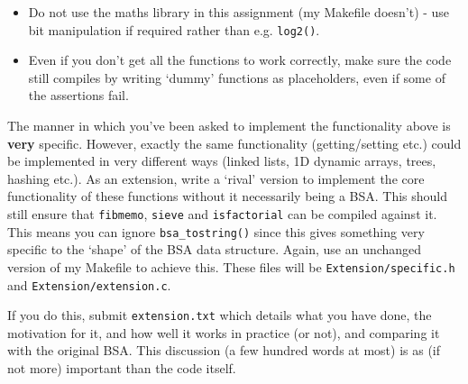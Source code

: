 \begin{exercise}
\begin{itemize}
\item Do not use the maths library in this assignment (my Makefile doesn't) -
use bit manipulation if required rather than e.g. \verb^log2()^.

\item Even if you don't get all the functions to work correctly, make
sure the code still compiles by writing `dummy' functions as placeholders,
even if some of the assertions fail.

\end{itemize}

\vspace*{1ex}

\noindent
The manner in which you've been asked to implement the functionality above is {\bf very}
specific. However, exactly the same functionality (getting/setting etc.) could be implemented
in very different ways (linked lists, 1D dynamic arrays, trees, hashing etc.).
As an extension, write a `rival' version to implement
the core functionality of these functions without it necessarily being a BSA.
This should still ensure that \verb^fibmemo^, \verb^sieve^ and
\verb^isfactorial^ can be compiled against it. This means you
can ignore \verb^bsa_tostring()^ since this gives something very
specific to the `shape' of the BSA data structure.  Again, use an
unchanged version of my Makefile to achieve this.  These files will be
\verb^Extension/specific.h^ and \verb^Extension/extension.c^.

If you do this, submit \verb^extension.txt^ which details what you
have done, the motivation for it, and how well it works in practice (or
not), and comparing it with the original BSA.
This discussion (a few hundred words at most) is as (if not more)
important than the code itself.


\end{exercise}
